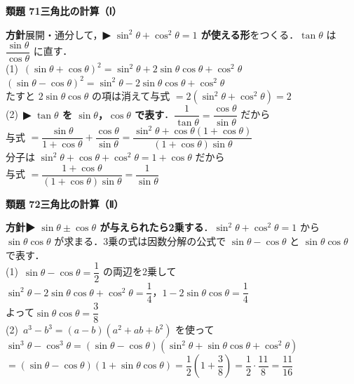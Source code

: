 \documentclass[a4paper,11pt]{ltjsarticle}
\newcommand{\ans}[2]{\Needspace{5\baselineskip}\vspace{6pt}%
  {\sffamily\bfseries 類題 #1\quad #2}\par}
\newcommand{\point}[1]{\textsf{\bfseries ▶ #1}}
\begin{document}
\ans{71}{三角比の計算（Ⅰ）}
\begin{kai}
\textbf{方針}\quad 展開・通分して，\point{$\sin^2\theta+\cos^2\theta=1$ が使える形}をつくる．$\tan\theta$ は $\dfrac{\sin\theta}{\cos\theta}$ に直す．\\[2pt]
(1)\ $(\sin\theta+\cos\theta)^2=\sin^2\theta+2\sin\theta\cos\theta+\cos^2\theta$\\
\hspace*{1.5em}$(\sin\theta-\cos\theta)^2=\sin^2\theta-2\sin\theta\cos\theta+\cos^2\theta$\\
\hspace*{1.5em}たすと $2\sin\theta\cos\theta$ の項は消えて\quad 与式 $=2(\sin^2\theta+\cos^2\theta)=2$\\[2pt]
(2)\ \point{$\tan\theta$ を $\sin\theta$，$\cos\theta$ で表す}．$\dfrac1{\tan\theta}=\dfrac{\cos\theta}{\sin\theta}$ だから\\[2pt]
\hspace*{1.5em}与式 $=\dfrac{\sin\theta}{1+\cos\theta}+\dfrac{\cos\theta}{\sin\theta}=\dfrac{\sin^2\theta+\cos\theta(1+\cos\theta)}{(1+\cos\theta)\sin\theta}$\\[2pt]
\hspace*{1.5em}分子は $\sin^2\theta+\cos\theta+\cos^2\theta=1+\cos\theta$ だから\\
\hspace*{1.5em}与式 $=\dfrac{1+\cos\theta}{(1+\cos\theta)\sin\theta}=\dfrac1{\sin\theta}$
\end{kai}

\ans{72}{三角比の計算（Ⅱ）}
\begin{kai}
\textbf{方針}\quad \point{$\sin\theta\pm\cos\theta$ が与えられたら2乗する}．$\sin^2\theta+\cos^2\theta=1$ から $\sin\theta\cos\theta$ が求まる．3乗の式は因数分解の公式で $\sin\theta-\cos\theta$ と $\sin\theta\cos\theta$ で表す．\\[2pt]
(1)\ $\sin\theta-\cos\theta=\dfrac12$ の両辺を2乗して\\
\hspace*{1.5em}$\sin^2\theta-2\sin\theta\cos\theta+\cos^2\theta=\dfrac14$，\quad $1-2\sin\theta\cos\theta=\dfrac14$\\
\hspace*{1.5em}よって\quad $\sin\theta\cos\theta=\dfrac38$\\[2pt]
(2)\ $a^3-b^3=(a-b)(a^2+ab+b^2)$ を使って\\
\hspace*{1.5em}$\sin^3\theta-\cos^3\theta=(\sin\theta-\cos\theta)(\sin^2\theta+\sin\theta\cos\theta+\cos^2\theta)$\\
\hspace*{1.5em}$=(\sin\theta-\cos\theta)(1+\sin\theta\cos\theta)=\dfrac12\left(1+\dfrac38\right)=\dfrac12\cdot\dfrac{11}8=\dfrac{11}{16}$
\end{kai}
\end{document}
